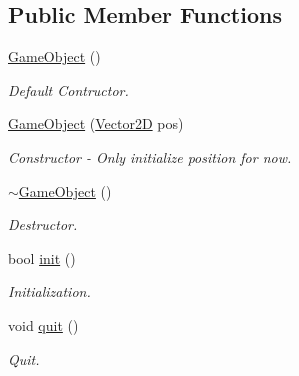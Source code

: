 \subsection*{Public Member Functions}
\begin{DoxyCompactItemize}
\item 
\mbox{\label{class_game_object_a0348e3ee2e83d56eafca7a3547f432c4}} 
\mbox{\hyperlink{class_game_object_a0348e3ee2e83d56eafca7a3547f432c4}{Game\+Object}} ()
\begin{DoxyCompactList}\small\item\em Default Contructor. \end{DoxyCompactList}\item 
\mbox{\label{class_game_object_a8ee84806fb618c1bf370830a9a5b21a2}} 
\mbox{\hyperlink{class_game_object_a8ee84806fb618c1bf370830a9a5b21a2}{Game\+Object}} (\mbox{\hyperlink{struct_vector2_d}{Vector2D}} pos)
\begin{DoxyCompactList}\small\item\em Constructor -\/ Only initialize position for now. \end{DoxyCompactList}\item 
\mbox{\label{class_game_object_ab82dfdb656f9051c0587e6593b2dda97}} 
\mbox{\hyperlink{class_game_object_ab82dfdb656f9051c0587e6593b2dda97}{$\sim$\+Game\+Object}} ()
\begin{DoxyCompactList}\small\item\em Destructor. \end{DoxyCompactList}\item 
\mbox{\label{class_game_object_a5aa3589f768b0e6f2c723f788ded7053}} 
bool \mbox{\hyperlink{class_game_object_a5aa3589f768b0e6f2c723f788ded7053}{init}} ()
\begin{DoxyCompactList}\small\item\em Initialization. \end{DoxyCompactList}\item 
\mbox{\label{class_game_object_a7e967263609344c4a519e4e670f8d9d6}} 
void \mbox{\hyperlink{class_game_object_a7e967263609344c4a519e4e670f8d9d6}{quit}} ()
\begin{DoxyCompactList}\small\item\em Quit. \end{DoxyCompactList}\item 

\end{DoxyCompactItemize}
